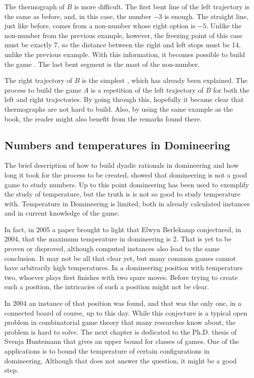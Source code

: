 The thermograph of $B$ is more difficult. The first bent line of the left trajectory is the same as before, and, in this case, the number ${-3}$ is enough. The straight line, just like before, comes from a non-number whose right option is ${-5}$. Unlike the non-number from the previous example, however, the freezing point of this case must be exactly 7, so the distance between the right and left stops must be 14, unlike the previous example. With this information, it becomes possible to build the game . The last bent segment is the mast of the non-number.

The right trajectory of $B$ is the simplest , which has already been explained. The process to build the game $A$ is a repetition of the left trajectory of $B$ for both the left and right trajectories. By going through this, hopefully it became clear that thermographs are not hard to build. Also, by using the same example as the book, the reader might also benefit from the remarks found there.

\subsection*{Numbers and temperatures in Domineering}

The brief description of how to build dyadic rationals in domineering and how long it took for the process to be created, showed that domineering is not a good game to study numbers. Up to this point domineering has been used to exemplify the study of temperature, but the truth is is not so good to study temperature with. Temperature in Domineering is limited, both in already calculated instances and in current knowledge of the game.

In fact, in 2005 a paper \cite{12} brought to light that Elwyn Berlekamp conjectured, in 2004, that the maximum temperature in domineering is 2. That is yet to be proven or disproved, although computed instances also lead to the same conclusion. It may not be all that clear yet, but many common games cannot have arbitrarily high temperatures. In a domineering position with temperature two, whoever plays first finishes with two spare moves. Before trying to create such a position, the intricacies of such a position might not be clear.

In 2004 an instance of that position was found, and that was the only one, in a connected board of course, up to this day. While this conjecture is a typical open problem in combinatorial game theory that many researches know about, the problem is hard to solve. The next chapter is dedicated to the Ph.D. thesis of Svenja Huntemann \cite{5} that gives an upper bound for classes of games. One of the applications is to bound the temperature of certain configurations in domineering. Although that does not answer the question, it might be a good step.


